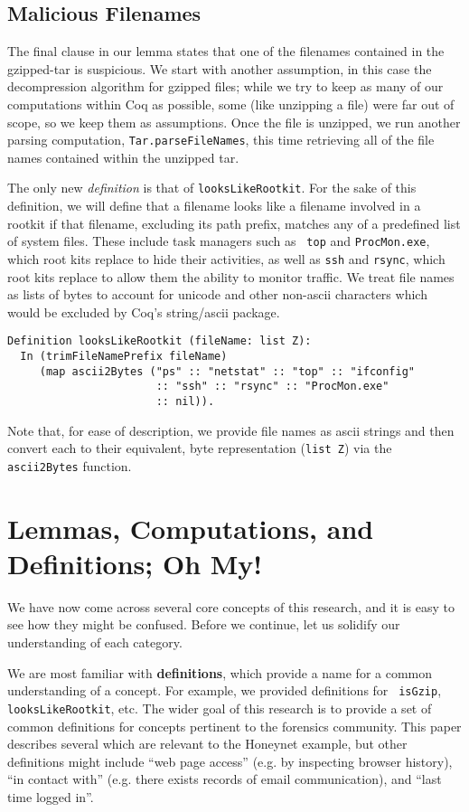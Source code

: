 \documentclass[nocopyrightspace]{sigplanconf}
\begin{document}
\subsection{Malicious Filenames}

The final clause in our lemma states that one of the filenames contained in
the gzipped-tar is suspicious. We start with  another assumption, in this case
the decompression algorithm for gzipped files; while we try to keep as many of
our computations within Coq as possible, some (like unzipping a file) were far
out of scope, so we keep them as assumptions. Once the file is unzipped, we
run another parsing computation, {\tt Tar.parseFileNames}, this time
retrieving all of the file names contained within the unzipped tar.

The only new {\it definition} is that of {\tt looksLikeRootkit}. For the sake
of this definition, we will define that a filename looks like a filename
involved in a rootkit if that filename, excluding its path prefix, matches any
of a predefined list of system files. These include task managers such as {\tt
top} and {\tt ProcMon.exe}, which root kits replace to hide their activities,
as well as {\tt ssh} and {\tt rsync}, which root kits replace to allow them
the ability to monitor traffic. We treat file names as lists of bytes to
account for unicode and other non-ascii characters which would be excluded by
Coq's string/ascii package.

\begin{lstlisting}
Definition looksLikeRootkit (fileName: list Z):
  In (trimFileNamePrefix fileName) 
     (map ascii2Bytes ("ps" :: "netstat" :: "top" :: "ifconfig" 
                       :: "ssh" :: "rsync" :: "ProcMon.exe" 
                       :: nil)).
\end{lstlisting}

Note that, for ease of description, we provide file names as ascii strings and
then convert each to their equivalent, byte representation ({\tt list Z}) via
the {\tt ascii2Bytes} function.

\section{Lemmas, Computations, and Definitions; Oh My!}

We have now come across several core concepts of this research, and it is easy
to see how they might be confused. Before we continue, let us solidify our
understanding of each category.

We are most familiar with {\bf definitions}, which provide a name for a common
understanding of a concept. For example, we provided definitions for {\tt
isGzip}, {\tt looksLikeRootkit}, etc. The wider goal of this research is to
provide a set of common definitions for concepts pertinent to the forensics
community. This paper describes several which are relevant to the Honeynet
example, but other definitions might include ``web page access'' (e.g. by
inspecting browser history), ``in contact with'' (e.g. there exists records of
email communication), and ``last time logged in''.
\end{document}
